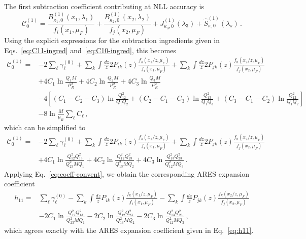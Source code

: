 The first subtraction coefficient contributing at NLL accuracy is
\begin{equation}
\label{eq:C10}
    \mathcal{C}_0^{(1)}=\frac{B_{\kappa_1,0}^{(1)}(x_1,\lambda_1)}{f_i(x_1,\mu_F)}+\frac{B_{\kappa_2,0}^{(1)}(x_2,\lambda_2)}{f_j(x_2,\mu_F)}+
    J_{\kappa_3,0}^{(1)}(\lambda_3)
    +\widehat{S}^{(1)}_{\kappa,0}\left(\lambda_s\right)\,.
\end{equation}
Using the explicit expressions for the subtraction ingredients given in
Eqs.~\eqref{eq:C11-ingred} and~\eqref{eq:C10-ingred}, this becomes
\begin{equation}
\label{eq:C10-init}
    \begin{aligned}
    \mathcal{C}^{(1)}_0={}&-2\sum_{\ell} \gamma_{\ell}^{(0)}
    +\sum_{k}\int\frac{dz}{z}2P_{ik}(z)\frac{f_k(x_1/z,\mu_F)}{f_i(x_1,\mu_F)}
    +\sum_{k}\int\frac{dz}{z}2P_{jk}(z)\frac{f_k(x_2/z,\mu_F)}{f_j(x_2,\mu_F)}\\
    &+4C_1\ln\frac{Q_1 M}{\mu_R^2}+4C_2\ln\frac{Q_2 M}{\mu_R^2}
    +4C_3\ln\frac{Q_3 M}{\mu_R^2} \\
    &-4\left[(C_1-C_2-C_3)\ln\frac{Q_{12}^2}{Q_1 Q_2}
    +(C_2-C_1-C_3)\ln\frac{Q_{13}^2}{Q_1 Q_3}
    +(C_3-C_1-C_2)\ln\frac{Q_{12}^2}{Q_1 Q_2}\right]\\
    &-8\ln\frac{M}{\mu_R}\sum_{\ell}C_{\ell}\,,
    \end{aligned}
\end{equation}
which can be simplified to
\begin{equation}
\label{eq:C01-simplified}
    \begin{aligned}
    \mathcal{C}^{(1)}_0={}&-2\sum_{\ell} \gamma_{\ell}^{(0)}
    +\sum_{k}\int\frac{dz}{z}2P_{ik}(z)\frac{f_k(x_1/z,\mu_F)}{f_i(x_1,\mu_F)}
    +\sum_{k}\int\frac{dz}{z}2P_{jk}(z)\frac{f_k(x_2/z,\mu_F)}{f_j(x_2,\mu_F)}\\
    &+4C_1\ln\frac{Q_{12}^2 Q_{13}^2}{Q_{23}^2 MQ_1}
    +4C_2\ln\frac{Q_{12}^2 Q_{23}^2}{Q_{13}^2 MQ_2}
    +4C_3\ln\frac{Q_{13}^2 Q_{23}^2}{Q_{12}^2 MQ_3}\,.
    \end{aligned}
\end{equation}
Applying Eq.~\eqref{eq:coeff-convent}, we obtain the corresponding
\textsc{ARES} expansion coefficient
\begin{equation}
\label{eq:SCET-h11}
    \begin{aligned}
    h_{11}=&\sum_{\ell}\gamma^{(0)}_{\ell}
    -\sum_{k}\int\frac{dz}{z}P_{ik}(z)\frac{f_k(x_1/z,\mu_F)}{f_i(x_1,\mu_F)}
    -\sum_{k}\int\frac{dz}{z}P_{jk}(z)\frac{f_k(x_2/z,\mu_F)}{f_j(x_2,\mu_F)}\\
    &-2C_1\ln\frac{Q_{12}^2 Q_{13}^2}{Q_{23}^2 MQ_1}
    -2C_2\ln\frac{Q_{12}^2 Q_{23}^2}{Q_{13}^2 MQ_2}
    -2C_3\ln\frac{Q_{13}^2 Q_{23}^2}{Q_{12}^2 MQ_3}\,,
    \end{aligned}
\end{equation}
which agrees exactly with the \textsc{ARES} expansion coefficient given
in Eq.~\eqref{eq:h11}.


